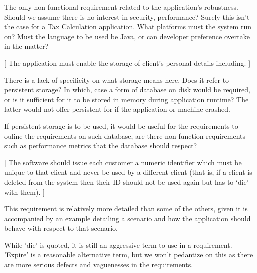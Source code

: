 The only non-functional requirement related to the application's robustness. Should we assume there is no interest in security, performance? Surely this isn't the case for a Tax Calculation application. What platforms must the system run on? Must the language to be used be Java, or can developer preference overtake in the matter? 





[ The application must enable the storage of client’s personal details including.  ] 

There is a lack of specificity on what storage means here. Does it refer to persistent storage? In which, case a form of database on disk would be required, or is it sufficient for it to be stored in memory during application runtime? The latter would not offer persistent for if the application or machine crashed.  

If persistent storage is to be used, it would be useful for the requirements to ouline the requirements on such database, are there non-function requirements such as performance metrics that the database should respect? 

[ The software should issue each customer a numeric identifier which must be unique to that client and never be used by a different client (that is, if a client is deleted from the system then their ID should not be used again but has to ‘die’ with them). ] 

This requirement is relatively more detailed than some of the others, given it is accompanied by an example detailing a scenario and how the application should behave with respect to that scenario. 

While 'die' is quoted, it is still an aggressive term to use in a requirement. 'Expire' is a reasonable alternative term, but we won't pedantize on this as there are more serious defects and vaguenesses in the requirements.

